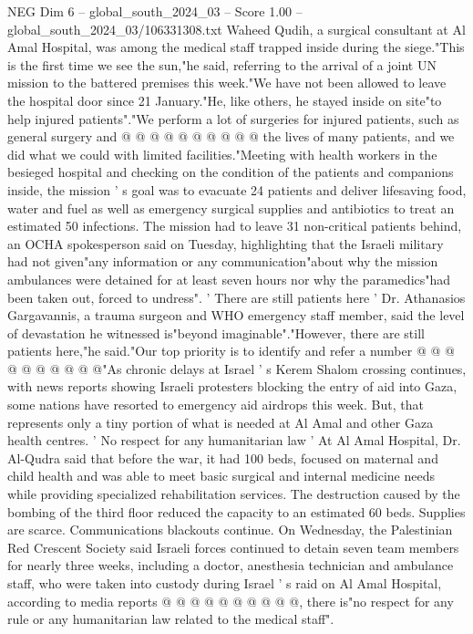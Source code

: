 \begin{textsample}{NEG Dim 6 – global\_south\_2024\_03 – Score 1.00 – global\_south\_2024\_03/106331308.txt}
Waheed Qudih, a surgical consultant at Al Amal Hospital, was among the medical staff trapped inside during the siege."This is the first time we see the sun,"he said, referring to the arrival of a joint UN mission to the battered premises this week."We have not been allowed to leave the hospital door since 21 January."He, like others, he stayed inside on site"to help injured patients"."We perform a lot of surgeries for injured patients, such as general surgery and @ @ @ @ @ @ @ @ @ @ the lives of many patients, and we did what we could with limited facilities."Meeting with health workers in the besieged hospital and checking on the condition of the patients and companions inside, the mission ' s goal was to evacuate 24 patients and deliver lifesaving food, water and fuel as well as emergency surgical supplies and antibiotics to treat an estimated 50 infections.
The mission had to leave 31 non-critical patients behind, an OCHA spokesperson said on Tuesday, highlighting that the Israeli military had not given"any information or any communication"about why the mission ambulances were detained for at least seven hours nor why the paramedics"had been taken out, forced to undress". ' There are still patients here ' Dr.
Athanasios Gargavannis, a trauma surgeon and WHO emergency staff member, said the level of devastation he witnessed is"beyond imaginable"."However, there are still patients here,"he said."Our top priority is to identify and refer a number @ @ @ @ @ @ @ @ @ @"As chronic delays at Israel ' s Kerem Shalom crossing continues, with news reports showing Israeli protesters blocking the entry of aid into Gaza, some nations have resorted to emergency aid airdrops this week.
But, that represents only a tiny portion of what is needed at Al Amal and other Gaza health centres. ' No respect for any humanitarian law ' At Al Amal Hospital, Dr.
Al-Qudra said that before the war, it had 100 beds, focused on maternal and child health and was able to meet basic surgical and internal medicine needs while providing specialized rehabilitation services.
The destruction caused by the bombing of the third floor reduced the capacity to an estimated 60 beds.
Supplies are scarce.
Communications blackouts continue.
On Wednesday, the Palestinian Red Crescent Society said Israeli forces continued to detain seven team members for nearly three weeks, including a doctor, anesthesia technician and ambulance staff, who were taken into custody during Israel ' s raid on Al Amal Hospital, according to media reports @ @ @ @ @ @ @ @ @ @, there is"no respect for any rule or any humanitarian law related to the medical staff".

\end{textsample}
